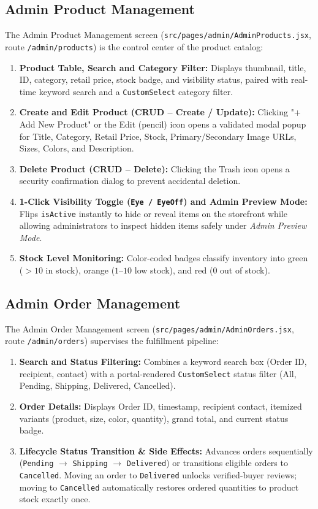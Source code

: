 \documentclass[12pt,a4paper,oneside]{report}
\begin{document}
\subsection{Admin Product Management}
The Admin Product Management screen (\texttt{src/pages/admin/AdminProducts.jsx}, route \texttt{/admin/products}) is the control center of the product catalog:
\begin{enumerate}[leftmargin=1.2cm]
    \item \textbf{Product Table, Search and Category Filter:} Displays thumbnail, title, ID, category, retail price, stock badge, and visibility status, paired with real-time keyword search and a \texttt{CustomSelect} category filter.
    \item \textbf{Create and Edit Product (CRUD -- Create / Update):} Clicking "+ Add New Product" or the Edit (pencil) icon opens a validated modal popup for Title, Category, Retail Price, Stock, Primary/Secondary Image URLs, Sizes, Colors, and Description.
    \item \textbf{Delete Product (CRUD -- Delete):} Clicking the Trash icon opens a security confirmation dialog to prevent accidental deletion.
    \item \textbf{1-Click Visibility Toggle (\texttt{Eye / EyeOff}) and Admin Preview Mode:} Flips \texttt{isActive} instantly to hide or reveal items on the storefront while allowing administrators to inspect hidden items safely under \textit{Admin Preview Mode}.
    \item \textbf{Stock Level Monitoring:} Color-coded badges classify inventory into green ($>10$ in stock), orange ($1$--$10$ low stock), and red ($0$ out of stock).
\end{enumerate}

\subsection{Admin Order Management}
The Admin Order Management screen (\texttt{src/pages/admin/AdminOrders.jsx}, route \texttt{/admin/orders}) supervises the fulfillment pipeline:
\begin{enumerate}[leftmargin=1.2cm]
    \item \textbf{Search and Status Filtering:} Combines a keyword search box (Order ID, recipient, contact) with a portal-rendered \texttt{CustomSelect} status filter (All, Pending, Shipping, Delivered, Cancelled).
    \item \textbf{Order Details:} Displays Order ID, timestamp, recipient contact, itemized variants (product, size, color, quantity), grand total, and current status badge.
    \item \textbf{Lifecycle Status Transition \& Side Effects:} Advances orders sequentially (\texttt{Pending} $\rightarrow$ \texttt{Shipping} $\rightarrow$ \texttt{Delivered}) or transitions eligible orders to \texttt{Cancelled}. Moving an order to \texttt{Delivered} unlocks verified-buyer reviews; moving to \texttt{Cancelled} automatically restores ordered quantities to product stock exactly once.
\end{enumerate}
\end{document}
